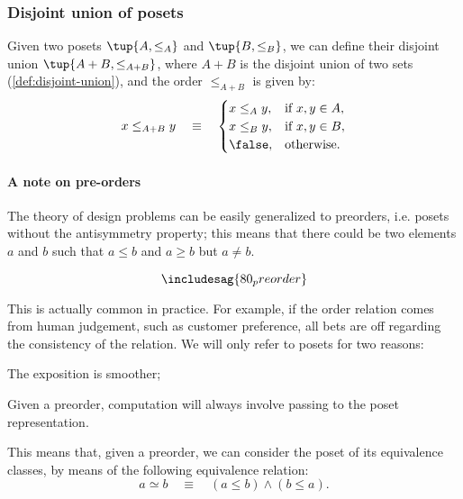 \subsubsection{Disjoint union of posets}


\begin{definition}
Given two posets $\tup{A, \leq_A} $ and $\tup{B, \leq_B} $,
we can define their disjoint union $\tup{ A + B, \leq_{A + B}}$, where $A + B$
is the disjoint union of two sets (\cref{def:disjoint-union}), and the
order $\leq_{A + B}$ is given by:
\begin{equation}
    x \leq_{A + B} y \quad\equiv\quad
    \begin{cases}
        x \leq_A y, & \text{if } x,y \in A, \\
        x \leq_B y, & \text{if } x,y \in B, \\
        \false,  & \text{otherwise}.
    \end{cases}
\end{equation}
\end{definition}


\begin{figure}[h!]
    \centering
    \caption{\label{fig:poset-coproduct}}
\end{figure}




\paragraph{A note on pre-orders}

    The theory of design problems can be easily generalized to preorders, i.e. posets without the antisymmetry property; this means that there could be two elements $a$ and $b$ such that $a\leq b$ and $a \geq b$ but $a \neq b$.

    \begin{equation}
    \includesag{80_preorder}
    \end{equation}

    This is actually common in practice. For example, if the order relation comes from human judgement, such as customer preference, all bets are off regarding the consistency of the relation. We will only refer to posets for two reasons:
    \begin{compactenum}
        \item The exposition is smoother;
        \item Given a preorder, computation will always involve passing to the poset representation.
    \end{compactenum}
    This means that, given a preorder, we can consider the poset of its equivalence classes, by means of the following equivalence relation:
    \begin{equation}
        a \simeq b \quad \equiv \quad (a \leq b) \wedge (b \leq a).
    \end{equation}%
    

